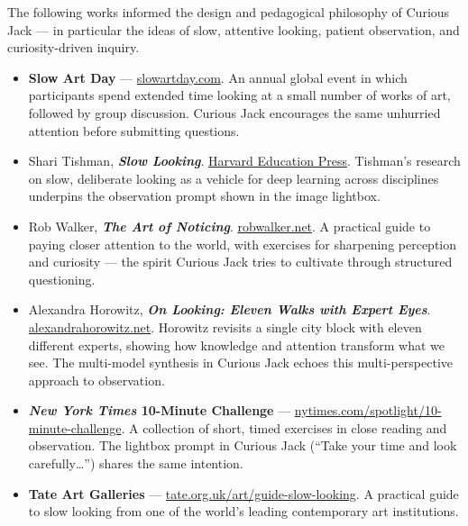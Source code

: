 \documentclass[11pt]{article}
\begin{document}
The following works informed the design and pedagogical philosophy of
Curious Jack --- in particular the ideas of slow, attentive looking,
patient observation, and curiosity-driven inquiry.

\begin{itemize}

  \item \textbf{Slow Art Day} ---
        \href{https://www.slowartday.com}{slowartday.com}.
        An annual global event in which participants spend extended time
        looking at a small number of works of art, followed by group
        discussion. Curious Jack encourages the same unhurried attention
        before submitting questions.

  \item Shari Tishman, \textbf{\emph{Slow Looking}}.
        \href{https://www.hepg.org/hep-home/books/slow-looking}{Harvard
        Education Press}. Tishman's research on slow, deliberate looking
        as a vehicle for deep learning across disciplines underpins the
        observation prompt shown in the image lightbox.

  \item Rob Walker, \textbf{\emph{The Art of Noticing}}.
        \href{https://robwalker.net/the-art-of-noticing/}{robwalker.net}.
        A practical guide to paying closer attention to the world, with
        exercises for sharpening perception and curiosity --- the spirit
        Curious Jack tries to cultivate through structured questioning.

  \item Alexandra Horowitz, \textbf{\emph{On Looking: Eleven Walks with
        Expert Eyes}}.
        \href{https://www.alexandrahorowitz.net}{alexandrahorowitz.net}.
        Horowitz revisits a single city block with eleven different
        experts, showing how knowledge and attention transform what we
        see. The multi-model synthesis in Curious Jack echoes this
        multi-perspective approach to observation.

  \item \textbf{\emph{New York Times} 10-Minute Challenge} ---
        \href{https://www.nytimes.com/spotlight/10-minute-challenge}{nytimes.com/spotlight/10-minute-challenge}.
        A collection of short, timed exercises in close reading and
        observation. The lightbox prompt in Curious Jack (``Take your
        time and look carefully\ldots'') shares the same intention.

  \item \textbf{Tate Art Galleries} ---
        \href{https://www.tate.org.uk/art/guide-slow-looking}{tate.org.uk/art/guide-slow-looking}.
        A practical guide to slow looking from one of the world's leading
        contemporary art institutions.

\end{itemize}
\end{document}
